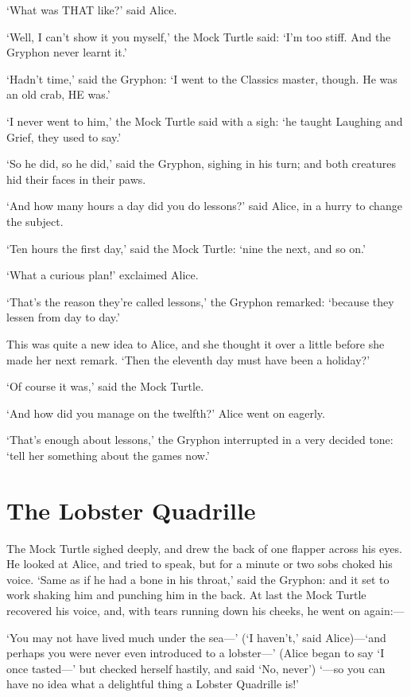 \documentclass[12pt]{article}
\begin{document}
\begin{Parallel}[p]{}{}
{‘What was THAT like?’ said Alice.

‘Well, I can’t show it you myself,’ the Mock Turtle said: ‘I’m too stiff. And the Gryphon never learnt it.’

‘Hadn’t time,’ said the Gryphon: ‘I went to the Classics master, though. He was an old crab, HE was.’

‘I never went to him,’ the Mock Turtle said with a sigh: ‘he taught Laughing and Grief, they used to say.’

‘So he did, so he did,’ said the Gryphon, sighing in his turn; and both creatures hid their faces in their paws.

‘And how many hours a day did you do lessons?’ said Alice, in a hurry to change the subject.

‘Ten hours the first day,’ said the Mock Turtle: ‘nine the next, and so on.’

‘What a curious plan!’ exclaimed Alice.

‘That’s the reason they’re called lessons,’ the Gryphon remarked: ‘because they lessen from day to day.’

This was quite a new idea to Alice, and she thought it over a little before she made her next remark. ‘Then the eleventh day must have been a holiday?’

‘Of course it was,’ said the Mock Turtle.

‘And how did you manage on the twelfth?’ Alice went on eagerly.

‘That’s enough about lessons,’ the Gryphon interrupted in a very decided tone: ‘tell her something about the games now.’




\section{The Lobster Quadrille}

The Mock Turtle sighed deeply, and drew the back of one flapper across his eyes. He looked at Alice, and tried to speak, but for a minute or two sobs choked his voice. ‘Same as if he had a bone in his throat,’ said the Gryphon: and it set to work shaking him and punching him in the back. At last the Mock Turtle recovered his voice, and, with tears running down his cheeks, he went on again:—

‘You may not have lived much under the sea—’ (‘I haven’t,’ said Alice)—‘and perhaps you were never even introduced to a lobster—’ (Alice began to say ‘I once tasted—’ but checked herself hastily, and said ‘No, never’) ‘—so you can have no idea what a delightful thing a Lobster Quadrille is!’

}
\end{Parallel}
\end{document}
